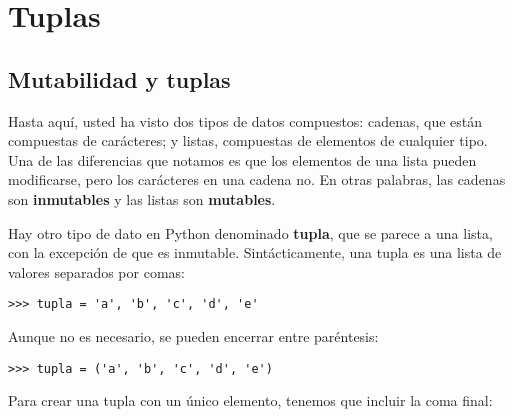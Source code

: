 




\chapter{Tuplas}
\label{tuplechap}

\section{Mutabilidad y tuplas}

Hasta aquí, usted ha visto dos tipos de datos compuestos: cadenas, que están
compuestas de carácteres; y listas, compuestas de elementos de
cualquier tipo. Una de las diferencias que notamos es que los elementos
de una lista pueden modificarse, pero los carácteres en una cadena no.
En otras palabras, las cadenas son {\bf inmutables} y las listas 
son {\bf mutables}.


Hay otro tipo de dato en Python denominado {\bf tupla}, que se parece a una 
lista, con la excepción de que es inmutable.  Sintácticamente, una tupla es 
una lista de valores separados por comas:

\beforeverb
\begin{verbatim}
>>> tupla = 'a', 'b', 'c', 'd', 'e'
\end{verbatim}
\afterverb
%
Aunque no es necesario, se pueden encerrar entre paréntesis:

\beforeverb
\begin{verbatim}
>>> tupla = ('a', 'b', 'c', 'd', 'e')
\end{verbatim}
\afterverb
%
Para crear una tupla con un único elemento, tenemos que incluir
la coma final:

